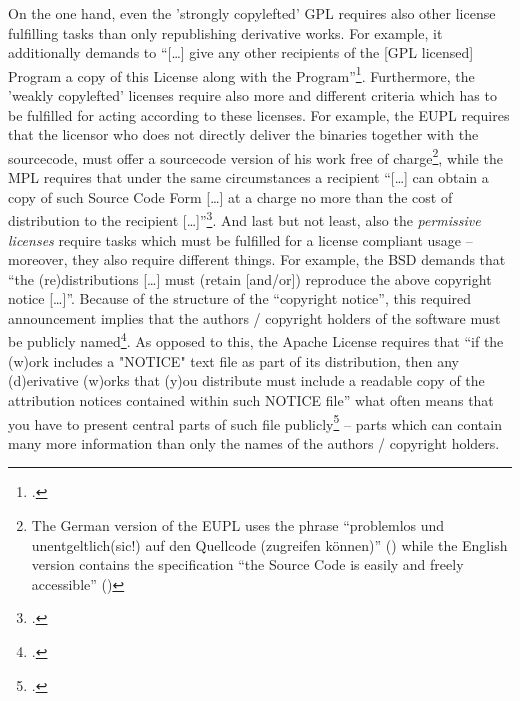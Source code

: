 On the one hand, even the 'strongly copylefted' GPL requires also other license
fulfilling tasks than only republishing derivative works. For example, it
additionally demands to \enquote{[\ldots] give any other recipients of the [GPL
licensed] Program a copy of this License along with the
Program}\footcite[cf.][\nopage wp §1]{Gpl20OsiLicense1991a}. Furthermore, the
'weakly copylefted' licenses require also more and different criteria which has
to be fulfilled for acting according to these licenses. For example, the EUPL
requires that the licensor who does not directly deliver the binaries together
with the sourcecode, must offer a sourcecode version of his work free of
charge\footnote{The German version of the EUPL uses the phrase
\enquote{problemlos und unentgeltlich(sic!) auf den Quellcode (zugreifen
können)} (\cite[cf.][3, section 3]{EuplLicense2007de}) while the English version
contains the specification \enquote{the Source Code is easily and freely
accessible} (\cite[cf.][2, section 3]{EuplLicense2007en})}, while the MPL
requires that under the same circumstances a recipient \enquote{[\ldots] can
obtain a copy of such Source Code Form [\ldots] at a charge no more than the
cost of distribution to the recipient [\ldots]}\footcite[cf.][\nopage section
3.2.a]{Mpl20OsiLicense2013a}. And last but not least, also the \emph{permissive
licenses} require tasks which must be fulfilled for a license compliant usage --
moreover, they also require different things. For example, the BSD demands that
\enquote{the (re)distributions [\ldots] must (retain [and/or]) reproduce the
above copyright notice [\ldots]}. Because of the structure of the
\enquote{copyright notice}, this required announcement implies that the authors
/ copyright holders of the software must be publicly named\footcite[cf.][\nopage
wp]{BsdLicense2Clause}. As opposed to this, the Apache License requires that
\enquote{if the (w)ork includes a "NOTICE" text file as part of its
distribution, then any (d)erivative (w)orks that (y)ou distribute must include a
readable copy of the attribution notices contained within such NOTICE file} what
often means that you have to present central parts of such file
publicly\footcite[cf.][\nopage wp.\ section 4.4]{Apl20OsiLicense2004a} -- parts
which can contain many more information than only the names of the authors /
copyright holders.

